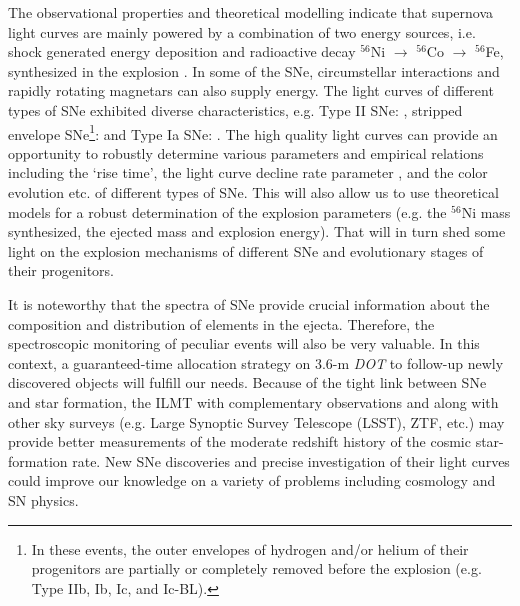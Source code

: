 \documentclass[useAMS,usenatbib]{mnras}
\begin{document}
The observational properties and theoretical modelling indicate that supernova light curves are
mainly powered by a combination of two energy sources, i.e. shock generated energy deposition and
radioactive decay $^{56}$Ni $\rightarrow$ $^{56}$Co $\rightarrow$ $^{56}$Fe, synthesized in the
explosion \citep[see][]{1960ApJ...132..565H,1969ApJ...157..623C,1982ApJ...253..785A}. In some of the
SNe, circumstellar interactions \citep{1978MmSAI..49..389R,1991MNRAS.250..513C,1994ApJ...420..268C}
and rapidly rotating magnetars \citep{2010ApJ...717..245K,2010ApJ...719L.204W,2012MNRAS.426L..76D}
can also supply energy.
The light curves of different types of SNe exhibited diverse characteristics,
e.g. Type II SNe: \citep{2012ApJ...756L..30A,2014ApJ...786...67A,2015ApJ...799..208S},
stripped envelope SNe\footnote{In these events, the outer envelopes of hydrogen and/or helium 
of their progenitors are partially or completely removed before the explosion (e.g. Type IIb, Ib, 
Ic, and Ic-BL).}: \citep{2011ApJ...741...97D,2014ApJS..213...19B,2015A&A...574A..60T,
2016MNRAS.457..328L,2016MNRAS.458.2973P} and Type Ia SNe: \citep[][and references 
therein]{2010ApJ...712..350H,2016MNRAS.460.3529A,2017ApJ...846...58H}. 
The high quality light curves can provide an opportunity to robustly determine various parameters
and empirical relations including the `rise time', the light curve decline rate parameter
\citep[$\Delta$m$_{15}$,][]{1993ApJ...413L.105P}, and the color evolution etc. of different types 
of SNe. This will also allow us to use theoretical models for a robust determination of the explosion 
parameters (e.g. the $^{56}$Ni mass synthesized, the ejected mass and explosion energy). 
That will in turn shed some light on the explosion mechanisms of different SNe and evolutionary
stages of their progenitors. 


It is noteworthy that the spectra of SNe provide crucial information about the composition and 
distribution of elements in the ejecta. Therefore, the spectroscopic monitoring of peculiar events 
will also be very valuable. In this context, a guaranteed-time allocation strategy on 3.6-m {\it DOT} 
to follow-up newly discovered objects will fulfill our needs.
Because of the tight link between SNe and star formation, the ILMT with complementary observations and 
along with other sky surveys (e.g. Large Synoptic Survey Telescope (LSST), ZTF, etc.) 
may provide better measurements of the moderate redshift history of the cosmic star-formation rate. 
New SNe discoveries and precise investigation of their light curves could improve our knowledge on a variety 
of problems including cosmology and SN physics.
\end{document}
